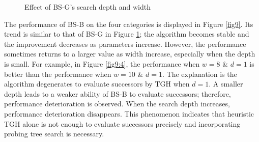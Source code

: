\documentclass[review,3p,times,authoryear,12pt]{elsarticle}
\begin{document}
\begin{figure}[!htb]
\caption{Effect of BS-G's search depth and width}
\label{fig8}
\end{figure}

The performance of BS-B on the four categories is displayed in Figure \ref{fig9}. Its trend is similar to that of BS-G in Figure \ref{fig8}; the algorithm becomes stable and the improvement decreases as parameters increase. 
However, the performance sometimes returns to a larger value as width increase, especially when the depth is small. 
For example, in Figure \ref{fig9:4}, the performance when $w=8$ \& $d=1$ is better than the performance when $w=10$ \& $d=1$. 
The explanation is the algorithm degenerates to evaluate successors by TGH when $d=1$. 
A smaller depth leads to a weaker ability of BS-B to evaluate successors; therefore, performance deterioration is observed. 
When the search depth increases, performance deterioration disappears. 
This phenomenon indicates that heuristic TGH alone is not enough to evaluate successors precisely and incorporating probing tree search is necessary.
\end{document}

